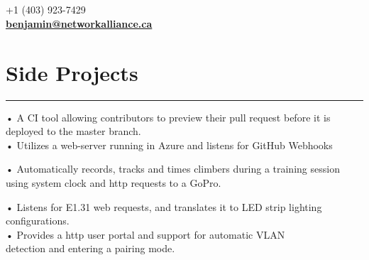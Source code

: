 \documentclass[]{rahulworld-resume}
\begin{document}
\begin{minipage}[t]{0.66\textwidth} 
\hspace*{0pt}\hfill    \\
\hspace*{0pt}\hfill    \\
\hspace*{0pt}\hfill    \\
\hspace*{0pt}\hfill    \\
\hspace*{0pt}\hfill +1 (403) 923-7429 \\
\hspace*{0pt}\hfill \textbf{\href{mailto:benjamin@networkalliance.ca}{benjamin@networkalliance.ca}} \\
\section{Side Projects}
\noindent\rule{12.5cm}{0.4pt}
\noindent
\hspace{3em}%
\begin{minipage}{0.85\textwidth\vspace{5pt}}
• A CI tool allowing contributors to preview their pull request before it is deployed to the master branch.\\
• Utilizes a web-server running in Azure and listens for GitHub Webhooks
\end{minipage}
\noindent
\hspace{3em}%
\begin{minipage}{0.85\textwidth\vspace{5pt}}
• Automatically records, tracks and times climbers during a training session using system clock and http requests to a GoPro.
\end{minipage}
\noindent
\hspace{3em}%
\begin{minipage}{0.85\textwidth\vspace{5pt}}
• Listens for E1.31 web requests, and translates it to LED strip lighting configurations.\\
• Provides a http user portal and support for automatic VLAN\\detection and entering a pairing mode.
\end{minipage}

\end{minipage}
\end{document}
